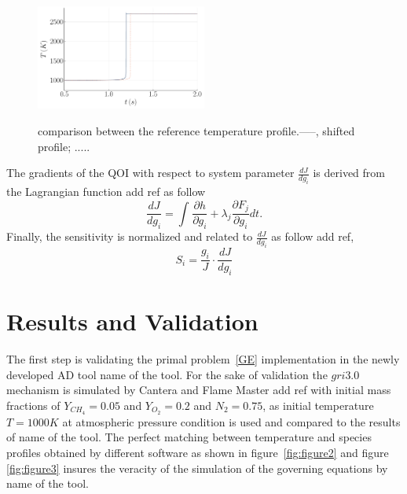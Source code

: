 \documentclass[preprint,review,12pt]{elsarticle}
\begin{document}
\begin{figure}
\centering
 {\includegraphics[width=0.5\textwidth]{figures/time shift without legend.pdf}}
\caption{comparison between the reference temperature profile.-----, shifted profile;  {\color{red} .....}   }
    \label{fig:figure1}
 \end{figure}
The gradients of the QOI with respect to system parameter $\frac{d J}{dg_i}$ is derived from the Lagrangian function {\color{red} add ref}  as follow 
\begin{equation}
\frac{d J}{dg_i}= \int_{}^{} \frac{\partial h}{\partial g_i}+\lambda_j\frac{\partial F_j}{\partial g_i}dt.
\end{equation}
Finally, the sensitivity is normalized and related to $\frac{d J}{dg_i}$ as follow  {\color{red} add ref}, 
\begin{equation}
S_i=\frac{g_i}{J}\cdot\frac{d J}{dg_i}
\end{equation}   



\section{Results and Validation}
The first step is validating the primal problem~\ref{GE} implementation in the newly developed AD tool  {\color{red} name of the tool}. For the sake of validation the $gri3.0$ mechanism is simulated by Cantera and Flame Master {\color{red} add ref} with initial mass fractions of $Y_{CH_4} = 0.05$ and $Y_{O_2} = 0.2$ and $N_2=0.75$, as initial temperature $T=1000 K$ at atmospheric pressure condition is used and compared to the results of {\color{red} name of the tool}. The perfect matching between temperature and species profiles obtained by different software as shown in figure~\ref{fig:figure2} and figure \ref{fig:figure3} insures the veracity of the simulation of the governing equations by {\color{red} name of the tool}.
\end{document}
